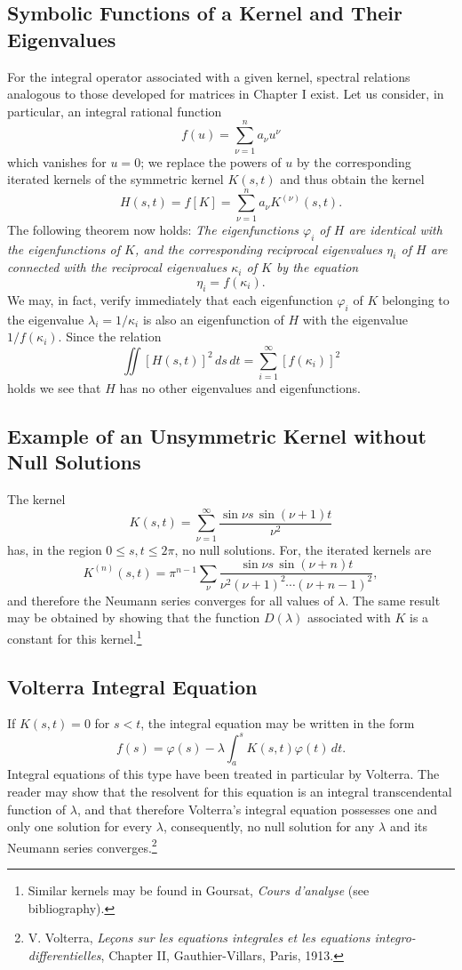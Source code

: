 \subsection{Symbolic Functions of a Kernel and Their Eigenvalues}
For the integral operator associated with a given kernel, spectral relations analogous to those developed for matrices in Chapter I exist. Let us consider, in particular, an integral rational function
\[
f(u)=\sum_{\nu=1}^{n}a_\nu u^\nu
\]
which vanishes for $u=0$; we replace the powers of $u$ by the corresponding iterated kernels of the symmetric kernel $K(s,t)$ and thus obtain the kernel
\[
H(s,t)=f[K]=\sum_{\nu=1}^{n}a_\nu K^{(\nu)}(s,t).
\]
The following theorem now holds: \emph{The eigenfunctions $\varphi_i$ of $H$ are identical with the eigenfunctions of $K$, and the corresponding reciprocal eigenvalues $\eta_i$ of $H$ are connected with the reciprocal eigenvalues $\kappa_i$ of $K$ by the equation}
\[
\eta_i=f(\kappa_i).
\]
We may, in fact, verify immediately that each eigenfunction $\varphi_i$ of $K$ belonging to the eigenvalue $\lambda_i=1/\kappa_i$ is also an eigenfunction of $H$ with the eigenvalue $1/f(\kappa_i)$. Since the relation
\[
\iint[H(s,t)]^2\,ds\,dt=\sum_{i=1}^{\infty}[f(\kappa_i)]^2
\]
holds we see that $H$ has no other eigenvalues and eigenfunctions.

\subsection{Example of an Unsymmetric Kernel without Null Solutions}
The kernel
\[
K(s,t)=\sum_{\nu=1}^{\infty}\frac{\sin \nu s\,\sin(\nu+1)t}{\nu^2}
\]
has, in the region $0\le s,t\le2\pi$, no null solutions. For, the iterated kernels are
\[
K^{(n)}(s,t)=\pi^{n-1}\sum_\nu
\frac{\sin \nu s\,\sin(\nu+n)t}
{\nu^2(\nu+1)^2\cdots(\nu+n-1)^2},
\]
and therefore the Neumann series converges for all values of $\lambda$. The same result may be obtained by showing that the function $D(\lambda)$ associated with $K$ is a constant for this kernel.\footnote{Similar kernels may be found in Goursat, \emph{Cours d'analyse} (see bibliography).}

\subsection{Volterra Integral Equation}
If $K(s,t)=0$ for $s<t$, the integral equation may be written in the form
\[
f(s)=\varphi(s)-\lambda\int_a^s K(s,t)\varphi(t)\,dt.
\]
Integral equations of this type have been treated in particular by Volterra. The reader may show that the resolvent for this equation is an integral transcendental function of $\lambda$, and that therefore Volterra's integral equation possesses one and only one solution for every $\lambda$, consequently, no null solution for any $\lambda$ and its Neumann series converges.\footnote{V. Volterra, \emph{Le\c{c}ons sur les equations integrales et les equations integro-differentielles}, Chapter II, Gauthier-Villars, Paris, 1913.}

